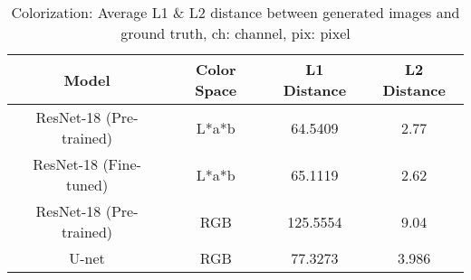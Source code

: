 \begin{table}
\centering
\small
    \begin{tabular}{c | c | c | c}
        \hline
        \textbf{Model} & \textbf{Color Space} & \textbf{
        L1 Distance} & \textbf{L2 Distance}\\
        \hline
        ResNet-18 (Pre-trained) & L*a*b & 64.5409 & 2.77\\
        ResNet-18 (Fine-tuned) & L*a*b & 65.1119 & 2.62\\
        ResNet-18 (Pre-trained) & RGB & 125.5554 & 9.04\\
        U-net & RGB & 77.3273 & 3.986\\
        \hline
    \end{tabular}
\caption{Colorization: Average L1 \& L2 distance between generated images and ground truth, ch: channel, pix: pixel}
\label{tab:colorization_results}
\end{table}